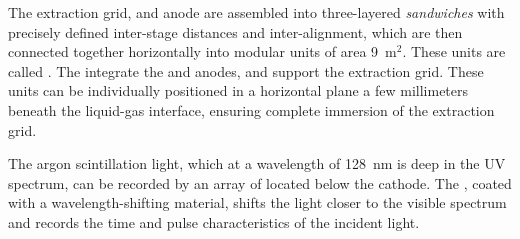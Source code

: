 The extraction grid,  and anode are assembled into three-layered \textit{sandwiches} 
with precisely defined inter-stage distances and inter-alignment,  which are then connected together horizontally into
modular units of area \num{9}~m$^2$. These units are called .
The  integrate the  and anodes, and support the extraction grid. These units can be individually positioned in a horizontal plane a few millimeters beneath the liquid-gas interface, ensuring complete immersion of the extraction grid.


The argon scintillation light, which at a wavelength of  \SI{128}{nm} is deep in the UV spectrum, can be 
 recorded by an array of  located below the cathode. %
The , coated with a wavelength-shifting material, shifts the light  closer to the visible spectrum and records the time and pulse characteristics of the incident light.


